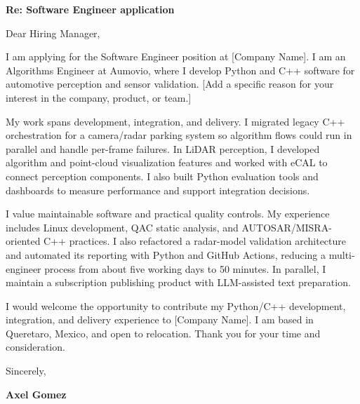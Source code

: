 


\textbf{Re: Software Engineer application}

Dear Hiring Manager,

I am applying for the Software Engineer position at [Company Name]. I am an Algorithms Engineer at Aumovio, where I develop Python and C++ software for automotive perception and sensor validation. [Add a specific reason for your interest in the company, product, or team.]

My work spans development, integration, and delivery. I migrated legacy C++ orchestration for a camera/radar parking system so algorithm flows could run in parallel and handle per-frame failures. In LiDAR perception, I developed algorithm and point-cloud visualization features and worked with eCAL to connect perception components. I also built Python evaluation tools and dashboards to measure performance and support integration decisions.

I value maintainable software and practical quality controls. My experience includes Linux development, QAC static analysis, and AUTOSAR/MISRA-oriented C++ practices. I also refactored a radar-model validation architecture and automated its reporting with Python and GitHub Actions, reducing a multi-engineer process from about five working days to 50 minutes. In parallel, I maintain a subscription publishing product with LLM-assisted text preparation.

I would welcome the opportunity to contribute my Python/C++ development, integration, and delivery experience to [Company Name]. I am based in Queretaro, Mexico, and open to relocation. Thank you for your time and consideration.

\vspace{12pt}
Sincerely,

\vspace{8pt}
\textbf{Axel Gomez}
